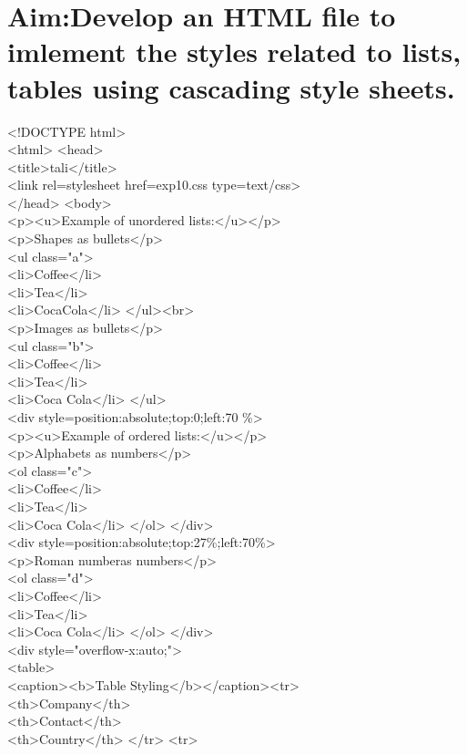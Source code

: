 \section*{\fontsize{16}{14}\selectfont Aim:Develop an HTML file to imlement the styles related to lists, tables using
cascading style sheets.}
<!DOCTYPE html>\\
<html> <head>\\
<title>tali</title>\\
<link rel=stylesheet href=exp10.css type=text/css>\\
</head> <body>\\
<p><u>Example of unordered lists:</u></p>\\
<p>Shapes as bullets</p>\\
<ul class="a">\\
<li>Coffee</li>\\
<li>Tea</li>\\
<li>CocaCola</li> </ul><br>\\
<p>Images as bullets</p>\\
<ul class="b">\\
<li>Coffee</li>\\
<li>Tea</li>\\
<li>Coca Cola</li> </ul>\\
<div style=position:absolute;top:0;left:70 \%> \\
<p><u>Example of ordered lists:</u></p>\\
<p>Alphabets as numbers</p>\\
<ol class="c">\\
<li>Coffee</li>\\
<li>Tea</li>\\
<li>Coca Cola</li> </ol> </div>\\
<div style=position:absolute;top:27\%;left:70\%>\\
<p>Roman numberas numbers</p>\\
<ol class="d">\\
<li>Coffee</li>\\
<li>Tea</li>\\
<li>Coca Cola</li> </ol> </div>\\
<div style="overflow-x:auto;">\\
<table>\\
<caption><b>Table Styling</b></caption><tr>\\
<th>Company</th>\\
<th>Contact</th>\\
<th>Country</th> </tr> <tr>\\

